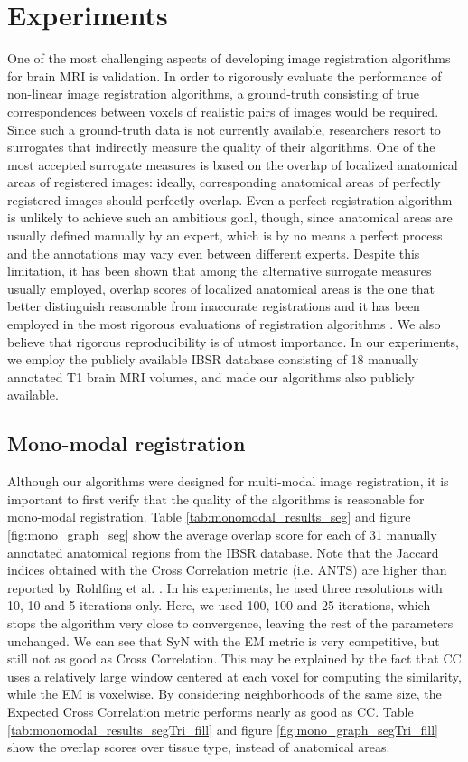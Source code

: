 \section{Experiments}
One of the most challenging aspects of developing image registration algorithms for brain MRI is validation. In order to rigorously evaluate the performance of non-linear
image registration algorithms, a ground-truth consisting of true correspondences between voxels of realistic pairs of images would be required. Since such a ground-truth data is
not currently available, researchers resort to surrogates that indirectly measure the quality of their algorithms. One of the most accepted surrogate measures is based
on the overlap of localized anatomical areas of registered images: ideally, corresponding anatomical areas of perfectly registered images should perfectly
overlap. Even a perfect registration algorithm is unlikely to achieve such an ambitious goal, though, since anatomical areas are usually defined manually by an expert, which is
by no means a perfect process and the annotations may vary even between different experts. Despite this limitation, it has been shown that among the alternative surrogate measures
usually employed, overlap scores of localized anatomical areas is the one that better distinguish reasonable from inaccurate registrations \cite{Rohlfing2012} and it has been employed
in the most rigorous evaluations of registration algorithms \cite{Klein2009}\cite{Rohlfing2012}. We also believe that rigorous reproducibility is of utmost importance. In our
experiments, we employ the publicly available IBSR database consisting of 18 manually annotated T1 brain MRI volumes, and made our algorithms also publicly available.

\subsection{Mono-modal registration}
Although our algorithms were designed for multi-modal image registration, it is important to first verify that the quality of the algorithms is reasonable for mono-modal registration.
Table \ref{tab:monomodal_results_seg} and figure \ref{fig:mono_graph_seg} show the average overlap score for each of 31 manually annotated anatomical regions from the IBSR database.
Note that the Jaccard indices obtained with the Cross Correlation metric (i.e. ANTS) are higher than reported by Rohlfing et al. \cite{Rohlfing2012}. In his experiments, he used
three resolutions with 10, 10 and 5 iterations only. Here, we used 100, 100 and 25 iterations, which stops the algorithm very close to convergence, leaving the rest of the parameters
unchanged. We can see that SyN with the EM metric is very competitive, but still not as good as Cross Correlation. This may be explained by the fact that CC uses a relatively large
window centered at each voxel for computing the similarity, while the EM is voxelwise. By considering neighborhoods of the same size, the Expected Cross Correlation metric performs
nearly as good as CC. Table \ref{tab:monomodal_results_segTri_fill} and figure \ref{fig:mono_graph_segTri_fill} show the overlap scores over tissue type, instead of anatomical areas.

